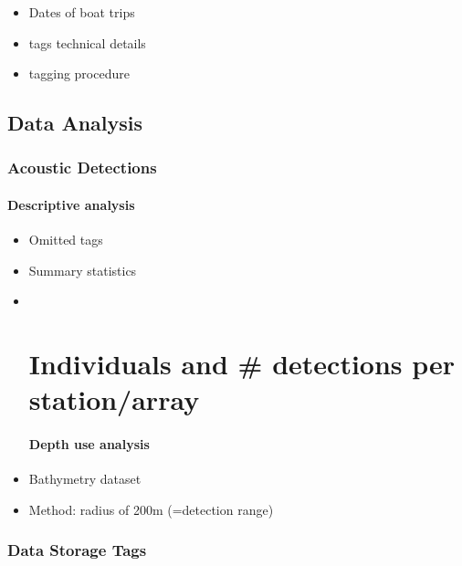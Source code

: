 \documentclass[
  authoryear,
  review,
  3p]{elsarticle}
\let\oldparagraph\paragraph
\renewcommand{\paragraph}[1]{\oldparagraph{#1}\mbox{}}
\providecommand{\tightlist}{%
  \setlength{\itemsep}{0pt}\setlength{\parskip}{0pt}}\usepackage{longtable,booktabs,array}
\begin{document}
\begin{itemize}
\tightlist
\item
  Dates of boat trips
\item
  tags technical details
\item
  tagging procedure
\end{itemize}

\hypertarget{data-analysis}{%
\subsection{Data Analysis}\label{data-analysis}}

\hypertarget{acoustic-detections}{%
\subsubsection{Acoustic Detections}\label{acoustic-detections}}

\hypertarget{descriptive-analysis}{%
\paragraph{Descriptive analysis}\label{descriptive-analysis}}

\begin{itemize}
\item
  Omitted tags
\item
  Summary statistics
\item ~
  \hypertarget{individuals-and-detections-per-stationarray}{%
  \section{Individuals and \# detections per
  station/array}\label{individuals-and-detections-per-stationarray}}

  \hypertarget{depth-use-analysis}{%
  \paragraph{Depth use analysis}\label{depth-use-analysis}}
\item
  Bathymetry dataset
\item
  Method: radius of 200m (=detection range)
\end{itemize}

\hypertarget{data-storage-tags}{%
\subsubsection{Data Storage Tags}\label{data-storage-tags}}
\end{document}
